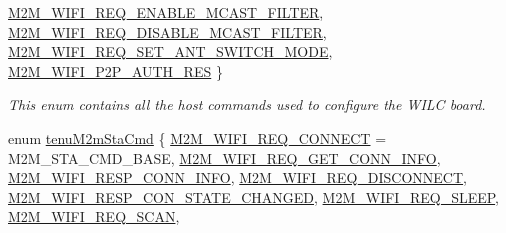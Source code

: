 \begin{DoxyCompactItemize}
\hyperlink{group__WlanEnums_gga57466b36df595c593e7ccc9892e14b20a7109ec18cea640c14a521d3d0cdeb1e7}{M2\+M\+\_\+\+W\+I\+F\+I\+\_\+\+R\+E\+Q\+\_\+\+E\+N\+A\+B\+L\+E\+\_\+\+M\+C\+A\+S\+T\+\_\+\+F\+I\+L\+T\+ER}, 
\hyperlink{group__WlanEnums_gga57466b36df595c593e7ccc9892e14b20add5f05bfabd486ac096b000dfab1fea1}{M2\+M\+\_\+\+W\+I\+F\+I\+\_\+\+R\+E\+Q\+\_\+\+D\+I\+S\+A\+B\+L\+E\+\_\+\+M\+C\+A\+S\+T\+\_\+\+F\+I\+L\+T\+ER}, 
\hyperlink{group__WlanEnums_gga57466b36df595c593e7ccc9892e14b20afaf4d6ffcf17a9531aba6d27f96f85be}{M2\+M\+\_\+\+W\+I\+F\+I\+\_\+\+R\+E\+Q\+\_\+\+S\+E\+T\+\_\+\+A\+N\+T\+\_\+\+S\+W\+I\+T\+C\+H\+\_\+\+M\+O\+DE}, 
\newline
\hyperlink{group__WlanEnums_gga57466b36df595c593e7ccc9892e14b20a3f2996edd7885e485b8c52bcfd6f6ccd}{M2\+M\+\_\+\+W\+I\+F\+I\+\_\+\+P2\+P\+\_\+\+A\+U\+T\+H\+\_\+\+R\+ES}
 \}\begin{DoxyCompactList}\small\item\em This enum contains all the host commands used to configure the W\+I\+LC board. \end{DoxyCompactList}
\item 
enum \hyperlink{group__WlanEnums_ga064de09dec1d5e88ed8d075fa40f57de}{tenu\+M2m\+Sta\+Cmd} \{ \newline
\hyperlink{group__WlanEnums_gga064de09dec1d5e88ed8d075fa40f57deaec25dcbb234f8f287439533565ace5e2}{M2\+M\+\_\+\+W\+I\+F\+I\+\_\+\+R\+E\+Q\+\_\+\+C\+O\+N\+N\+E\+CT} = M2\+M\+\_\+\+S\+T\+A\+\_\+\+C\+M\+D\+\_\+\+B\+A\+SE, 
\hyperlink{group__WlanEnums_gga064de09dec1d5e88ed8d075fa40f57deaea2bbf4baaf09b30a933fdeff7c000b1}{M2\+M\+\_\+\+W\+I\+F\+I\+\_\+\+R\+E\+Q\+\_\+\+G\+E\+T\+\_\+\+C\+O\+N\+N\+\_\+\+I\+N\+FO}, 
\hyperlink{group__WlanEnums_gga064de09dec1d5e88ed8d075fa40f57dea35767ad0217ab92b149bc77e79610d33}{M2\+M\+\_\+\+W\+I\+F\+I\+\_\+\+R\+E\+S\+P\+\_\+\+C\+O\+N\+N\+\_\+\+I\+N\+FO}, 
\hyperlink{group__WlanEnums_gga064de09dec1d5e88ed8d075fa40f57dea929aa54b372a97076010249cc4e139b8}{M2\+M\+\_\+\+W\+I\+F\+I\+\_\+\+R\+E\+Q\+\_\+\+D\+I\+S\+C\+O\+N\+N\+E\+CT}, 
\newline
\hyperlink{group__WlanEnums_gga064de09dec1d5e88ed8d075fa40f57deabb42b3025c56c51d915a1fa4abd2dbd0}{M2\+M\+\_\+\+W\+I\+F\+I\+\_\+\+R\+E\+S\+P\+\_\+\+C\+O\+N\+\_\+\+S\+T\+A\+T\+E\+\_\+\+C\+H\+A\+N\+G\+ED}, 
\hyperlink{group__WlanEnums_gga064de09dec1d5e88ed8d075fa40f57deaf17a1fde08d1870c06dcc6f7973a2ded}{M2\+M\+\_\+\+W\+I\+F\+I\+\_\+\+R\+E\+Q\+\_\+\+S\+L\+E\+EP}, 
\hyperlink{group__WlanEnums_gga064de09dec1d5e88ed8d075fa40f57deae522ee49cac55f1020a7aa527f172157}{M2\+M\+\_\+\+W\+I\+F\+I\+\_\+\+R\+E\+Q\+\_\+\+S\+C\+AN}, 

\end{DoxyCompactItemize}
